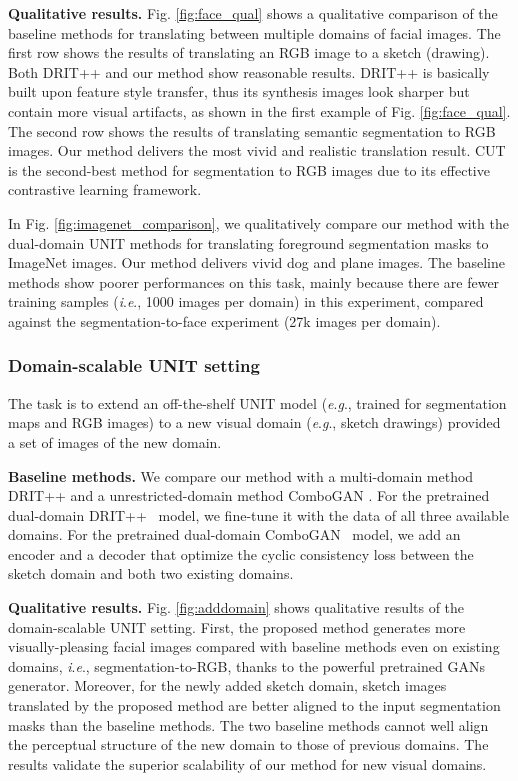 \documentclass[10pt,journal,compsoc]{IEEEtran}
\newcommand{\ie}{\textit{i}.\textit{e}.}
\newcommand{\eg}{\textit{e}.\textit{g}.}
\begin{document}
{\noindent\textbf{Qualitative results.}
Fig. \ref{fig:face_qual} shows a qualitative comparison of the baseline methods for translating between multiple domains of facial images. The first row shows the results of translating an RGB image to a sketch (drawing). Both DRIT++ \cite{drit++} and our method show reasonable results. DRIT++ is basically built upon feature style transfer, thus its synthesis images look sharper but contain more visual artifacts, as shown in the first example of Fig. \ref{fig:face_qual}. The second row shows the results of translating semantic segmentation to RGB images. Our method delivers the most vivid and realistic translation result. CUT \cite{cut} is the second-best method for segmentation to RGB images due to its effective contrastive learning framework. 

In Fig. \ref{fig:imagenet_comparison}, we qualitatively compare our method with the dual-domain UNIT methods for translating foreground segmentation masks to ImageNet images. Our method delivers vivid dog and plane images. The baseline methods show poorer performances on this task, mainly because there are fewer training samples (\ie, 1000 images per domain) in this experiment, compared against the segmentation-to-face experiment (27k images per domain). 

\subsubsection{Domain-scalable UNIT setting}
\label{sec:domainscalableUNIT}
The task is to extend an off-the-shelf UNIT model (\eg, trained for segmentation maps and RGB images) to a new visual domain (\eg, sketch drawings) provided a set of images of the new domain.

\noindent\textbf{Baseline methods.} We compare our method with a multi-domain method DRIT++ \cite{drit++} and a unrestricted-domain method ComboGAN \cite{combogan}. For the pretrained dual-domain DRIT++~\cite{drit++} model, we fine-tune it with the data of all three available domains. For the pretrained dual-domain ComboGAN~\cite{combogan} model, we add an encoder and a decoder that optimize the cyclic consistency loss between the sketch domain and both two existing domains.

\noindent\textbf{Qualitative results.} 
Fig. \ref{fig:adddomain} shows qualitative results of the  domain-scalable UNIT setting. First, the proposed method generates more visually-pleasing facial images compared with baseline methods even on existing domains, \ie, segmentation-to-RGB, thanks to the powerful pretrained GANs generator.
Moreover, for the newly added sketch domain, sketch images translated by the proposed method are better aligned to the input segmentation masks than the baseline methods. The two baseline methods cannot well align the perceptual structure of the new domain to those of previous domains. The results validate the superior scalability of our method for new visual domains. 


}
\end{document}
